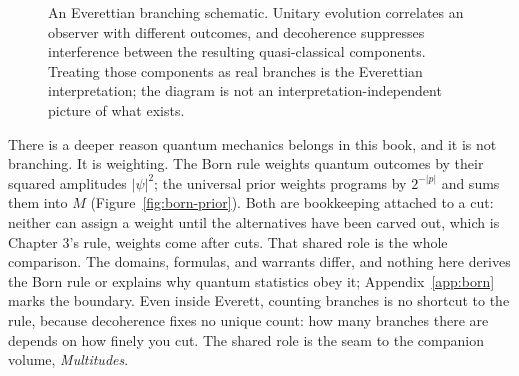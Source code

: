 \begin{figure}[h]
\centering
{}
\caption{An Everettian branching schematic. Unitary evolution correlates an observer with different outcomes, and decoherence suppresses interference between the resulting quasi-classical components. Treating those components as real branches is the Everettian interpretation; the diagram is not an interpretation-independent picture of what exists.}
\label{fig:mwi-branching}
\end{figure}

There is a deeper reason quantum mechanics belongs in this book, and it is not branching. It is weighting. The Born rule weights quantum outcomes by their squared amplitudes $|\psi|^2$; the universal prior weights programs by $2^{-|p|}$ and sums them into $M$ (Figure~\ref{fig:born-prior}). Both are bookkeeping attached to a cut: neither can assign a weight until the alternatives have been carved out, which is Chapter 3's rule, weights come after cuts. That shared role is the whole comparison. The domains, formulas, and warrants differ, and nothing here derives the Born rule or explains why quantum statistics obey it; Appendix~\ref{app:born} marks the boundary. Even inside Everett, counting branches is no shortcut to the rule, because decoherence fixes no unique count: how many branches there are depends on how finely you cut. The shared role is the seam to the companion volume, \textit{Multitudes}.

